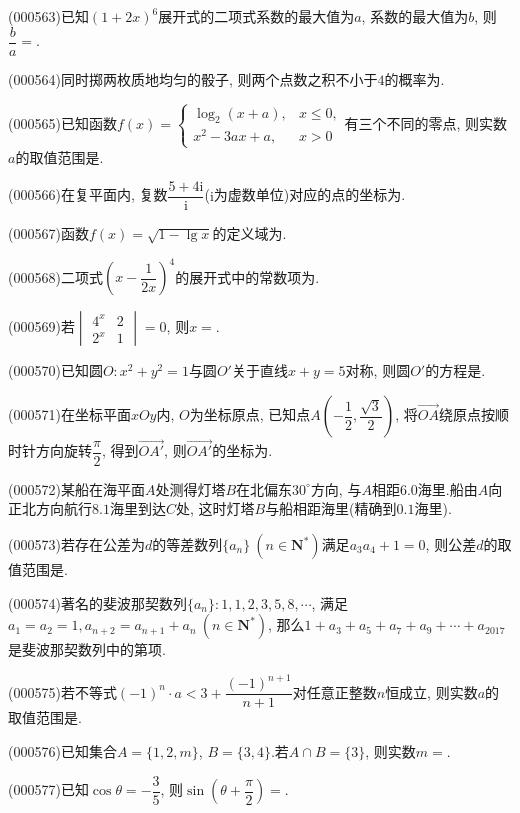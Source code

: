 \item (000563)已知$(1+2x)^6$展开式的二项式系数的最大值为$a$, 系数的最大值为$b$, 则$\dfrac ba=$.
\item (000564)同时掷两枚质地均匀的骰子, 则两个点数之积不小于$4$的概率为.
\item (000565)已知函数$f(x)=\begin{cases} \log_2 (x+a), & x\le 0, \\ x^2-3ax+a, & x>0 \end{cases}$有三个不同的零点, 则实数$a$的取值范围是.
\item (000566)在复平面内, 复数$\dfrac{5+4\mathrm{i}}{\mathrm{i}}$($\mathrm{i}$为虚数单位)对应的点的坐标为.
\item (000567)函数$f(x)=\sqrt{1-\lg x}$的定义域为.
\item (000568)二项式$(x-\dfrac1{2x})^4$的展开式中的常数项为.
\item (000569)若$\begin{vmatrix} 4^x & 2 \\ 2^x & 1 \end{vmatrix}=0$, 则$x=$.
\item (000570)已知圆$O:x^2+y^2=1$与圆$O'$关于直线$x+y=5$对称, 则圆$O'$的方程是.
\item (000571)在坐标平面$xOy$内, $O$为坐标原点, 已知点$A(-\dfrac12,\dfrac{\sqrt3}2)$, 将$\overrightarrow{OA}$绕原点按顺时针方向旋转$\dfrac{\pi}2$, 得到$\overrightarrow{OA'}$, 则$\overrightarrow{OA'}$的坐标为.
\item (000572)某船在海平面$A$处测得灯塔$B$在北偏东$30^\circ$方向, 与$A$相距$6.0$海里.船由$A$向正北方向航行$8.1$海里到达$C$处, 这时灯塔$B$与船相距海里(精确到$0.1$海里).
\item (000573)若存在公差为$d$的等差数列$\{a_n\} \ (n\in \mathbf{N}^*)$满足$a_3a_4+1=0$, 则公差$d$的取值范围是.
\item (000574)著名的斐波那契数列$\{a_n\}:1,1,2,3,5,8,\cdots$, 满足$a_1=a_2=1,a_{n+2}=a_{n+1}+a_n \ (n\in \mathbf{N}^*)$, 那么$1+a_3+a_5+a_7+a_9+\cdots+a_{2017}$是斐波那契数列中的第项.
\item (000575)若不等式$(-1)^n\cdot a<3+\dfrac{(-1)^{n+1}}{n+1}$对任意正整数$n$恒成立, 则实数$a$的取值范围是.
\item (000576)已知集合$A=\{1,2,m\}$, $B=\{3,4\}$.若$A\cap B=\{3\}$, 则实数$m=$.
\item (000577)已知$\cos\theta=-\dfrac35$, 则$\sin(\theta+\dfrac{\pi}2)=$.
